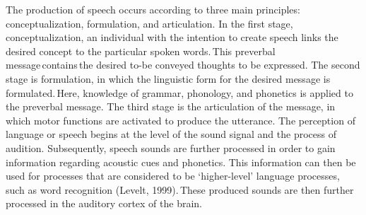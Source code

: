 The production of speech occurs according to three main principles: conceptualization, formulation, and articulation. In the first stage, conceptualization, an individual with the intention to create speech links the desired concept to the particular spoken words. This preverbal message contains the desired to-be conveyed thoughts to be expressed. The second stage is formulation, in which the linguistic form for the desired message is formulated. Here, knowledge of grammar, phonology, and phonetics is applied to the preverbal message. The third stage is the articulation of the message, in which motor functions are activated to produce the utterance. The perception of language or speech begins at the level of the sound signal and the process of audition. Subsequently, speech sounds are further processed in order to gain information regarding acoustic cues and phonetics. This information can then be used for processes that are considered to be ‘higher-level’ language processes, such as word recognition (Levelt, 1999). These produced sounds are then further processed in the auditory cortex of the brain. 

